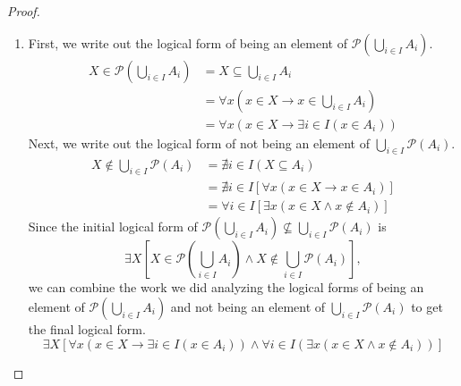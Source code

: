 \documentclass[12pt]{amsart}
\theoremstyle{definition}
\theoremstyle{remark}
\begin{document}
\begin{proof}
\begin{enumerate}
	\item First, we write out the logical form of being an element of
	$\mathscr{P} \left( \bigcup_{i \in I} A_i \right)$.
	\begin{align*}
		X \in \mathscr{P} \left( \bigcup_{i \in I} A_i \right)
		&= X \subseteq \bigcup_{i \in I} A_i \\
		&= \forall x \left( x \in X \rightarrow x \in \bigcup_{i \in I} A_i \right) \\
		&= \forall x(x \in X \rightarrow \exists i \in I (x \in A_i))
	\end{align*}
	Next, we write out the logical form of not being an element of
	$\bigcup_{i \in I} \mathscr{P}(A_i)$.
	\begin{align*}
		X \notin \bigcup_{i \in I} \mathscr{P}(A_i)
		&= \nexists i \in I (X \subseteq A_i) \\
		&= \nexists i \in I [\forall x (x \in X \rightarrow x \in A_i)] \\
		&= \forall i \in I [\exists x (x \in X \wedge x \notin A_i)]
	\end{align*}
	Since the initial logical form of $\mathscr{P} \left( \bigcup_{i \in I} A_i \right) 
	\nsubseteq \bigcup_{i \in I} \mathscr{P}(A_i)$ is
	\begin{equation*}
		\exists X 
		\left[ X \in \mathscr{P} \left( \bigcup_{i \in I} A_i \right) \wedge
		X \notin \bigcup_{i \in I} \mathscr{P}(A_i) \right],
	\end{equation*}
	we can combine the work we did analyzing the logical forms of being an element of
	$\mathscr{P} \left( \bigcup_{i \in I} A_i \right)$
	and not being an element of
	$\bigcup_{i \in I} \mathscr{P}(A_i)$
	to get the final logical form.
	\begin{equation*}
		\exists X 
		\left[ \forall x(x \in X \rightarrow \exists i \in I (x \in A_i)) \wedge
		\forall i \in I (\exists x (x \in X \wedge x \notin A_i)) \right]
	\end{equation*}
\end{enumerate}
\end{proof}
\end{document}
